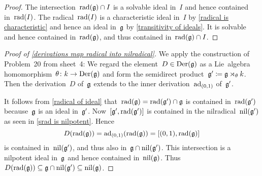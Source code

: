 \begin{proof}
  The intersection~$\operatorname{rad}(\mathfrak{g}) \cap I$ is a solvable ideal in~$I$ and hence contained in~$\operatorname{rad}(I)$.
  The radical~$\operatorname{rad}(I)$ is a characteristic ideal in~$I$ by \cref{radical is characteristic} and hence an ideal in~$\mathfrak{g}$ by \cref{transitivity of ideals}.
  It is solvable and hence contained in~$\operatorname{rad}(\mathfrak{g})$, and thus contained in~$\operatorname{rad}(\mathfrak{g}) \cap I$.
\end{proof}


\begin{proof}[Proof of \cref{derivations map radical into nilradical}]
  We apply the construction of Problem~20 from sheet~4:
  We regard the element~$D \in \operatorname{Der}(\mathfrak{g})$ as a Lie~algebra homomorphism~$\theta \colon k \to \operatorname{Der}(\mathfrak{g})$ and form the semidirect product~$\mathfrak{g}' \coloneqq \mathfrak{g} \rtimes_\theta k$.
  Then the derivation~$D$ of~$\mathfrak{g}$ extends to the inner derivation~$\operatorname{ad}_{(0,1)}$ of~$\mathfrak{g}'$.
  
  It follows from \cref{radical of ideal} that~$\operatorname{rad}(\mathfrak{g}) = \operatorname{rad}(\mathfrak{g}') \cap \mathfrak{g}$ is contained in~$\operatorname{rad}(\mathfrak{g}')$ because~$\mathfrak{g}$ is an ideal in~$\mathfrak{g}'$.
  Now~$[\mathfrak{g}', \operatorname{rad}(\mathfrak{g}')]$ is contained in the nilradical~$\operatorname{nil}(\mathfrak{g}')$ as seen in \cref{srad is nilpotent}.
  Hence
  \[
    D( \operatorname{rad}(\mathfrak{g}) )
    =
    \operatorname{ad}_{(0,1)}( \operatorname{rad}(\mathfrak{g}) )
    =
    [(0,1), \operatorname{rad}(\mathfrak{g})]
  \]
  is contained in~$\operatorname{nil}(\mathfrak{g}')$, and thus also in~$\mathfrak{g} \cap \operatorname{nil}(\mathfrak{g}')$.
  This intersection is a nilpotent ideal in~$\mathfrak{g}$ and hence contained in~$\operatorname{nil}(\mathfrak{g})$.
  Thus~$D(\operatorname{rad}(\mathfrak{g})) \subseteq \mathfrak{g} \cap \operatorname{nil}(\mathfrak{g}') \subseteq \operatorname{nil}(\mathfrak{g})$.
\end{proof}

